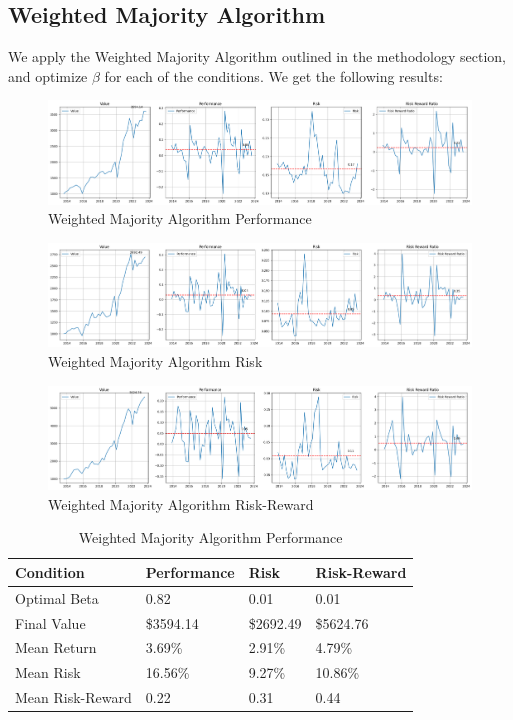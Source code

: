 \documentclass{article}
\begin{document}
\subsection{Weighted Majority Algorithm}
\label{subsec:weighted-majority}
We apply the Weighted Majority Algorithm outlined in the methodology section, and optimize $\beta$ for each of the conditions. We get the following results:
\begin{figure}[H]
    \centering
    \includegraphics[width=1\textwidth]{weighted_majority.png}
    \caption{Weighted Majority Algorithm Performance}
    \label{fig:weighted_majority}
\end{figure}
\begin{figure}[H]
    \centering
    \includegraphics[width=1\textwidth]{weighted_majority_risk.png}
    \caption{Weighted Majority Algorithm Risk}
    \label{fig:weighted_majority_risk}
\end{figure}
\begin{figure}[H]
    \centering
    \includegraphics[width=1\textwidth]{weighted_majority_risk_reward.png}
    \caption{Weighted Majority Algorithm Risk-Reward}
    \label{fig:weighted_majority_risk_reward}
\end{figure}
\begin{table}[H]
    \centering
    \begin{tabular}{l m{2cm} m{2cm} m{2cm}}
        \toprule
        {Condition} & {Performance} & {Risk} & {Risk-Reward} \\
        \midrule
        Optimal Beta & 0.82 & 0.01 & 0.01\\
        Final Value & \$3594.14 & \$2692.49 & \$5624.76\\
        Mean Return & 3.69\% & 2.91\% & 4.79\%\\
        Mean Risk & 16.56\% & 9.27\% & 10.86\%\\
        Mean Risk-Reward & 0.22 & 0.31 & 0.44\\
        \bottomrule
    \end{tabular}
    \caption{Weighted Majority Algorithm Performance}
\end{table}
\end{document}
